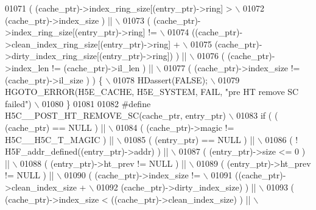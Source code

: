 \begin{DoxyCode}
01071 \textcolor{preprocessor}{     ( (cache\_ptr)->index\_ring\_size[(entry\_ptr)->ring] >                \(\backslash\)}
01072 \textcolor{preprocessor}{       (cache\_ptr)->index\_size ) ||                                     \(\backslash\)}
01073 \textcolor{preprocessor}{     ( (cache\_ptr)->index\_ring\_size[(entry\_ptr)->ring] !=               \(\backslash\)}
01074 \textcolor{preprocessor}{       ((cache\_ptr)->clean\_index\_ring\_size[(entry\_ptr)->ring] +         \(\backslash\)}
01075 \textcolor{preprocessor}{        (cache\_ptr)->dirty\_index\_ring\_size[(entry\_ptr)->ring]) ) ||     \(\backslash\)}
01076 \textcolor{preprocessor}{     ( (cache\_ptr)->index\_len != (cache\_ptr)->il\_len ) ||               \(\backslash\)}
01077 \textcolor{preprocessor}{     ( (cache\_ptr)->index\_size != (cache\_ptr)->il\_size ) ) \{            \(\backslash\)}
01078 \textcolor{preprocessor}{    HDassert(FALSE);                                                    \(\backslash\)}
01079 \textcolor{preprocessor}{    HGOTO\_ERROR(H5E\_CACHE, H5E\_SYSTEM, FAIL, "pre HT remove SC failed") \(\backslash\)}
01080 \textcolor{preprocessor}{\}}
01081 
01082 \textcolor{preprocessor}{#define H5C\_\_POST\_HT\_REMOVE\_SC(cache\_ptr, entry\_ptr)                     \(\backslash\)}
01083 \textcolor{preprocessor}{if ( ( (cache\_ptr) == NULL ) ||                                          \(\backslash\)}
01084 \textcolor{preprocessor}{     ( (cache\_ptr)->magic != H5C\_\_H5C\_T\_MAGIC ) ||                       \(\backslash\)}
01085 \textcolor{preprocessor}{     ( (entry\_ptr) == NULL ) ||                                          \(\backslash\)}
01086 \textcolor{preprocessor}{     ( ! H5F\_addr\_defined((entry\_ptr)->addr) ) ||                        \(\backslash\)}
01087 \textcolor{preprocessor}{     ( (entry\_ptr)->size <= 0 ) ||                                       \(\backslash\)}
01088 \textcolor{preprocessor}{     ( (entry\_ptr)->ht\_prev != NULL ) ||                                 \(\backslash\)}
01089 \textcolor{preprocessor}{     ( (entry\_ptr)->ht\_prev != NULL ) ||                                 \(\backslash\)}
01090 \textcolor{preprocessor}{     ( (cache\_ptr)->index\_size !=                                        \(\backslash\)}
01091 \textcolor{preprocessor}{       ((cache\_ptr)->clean\_index\_size +                                  \(\backslash\)}
01092 \textcolor{preprocessor}{    (cache\_ptr)->dirty\_index\_size) ) ||                              \(\backslash\)}
01093 \textcolor{preprocessor}{     ( (cache\_ptr)->index\_size < ((cache\_ptr)->clean\_index\_size) ) ||    \(\backslash\)}

\end{DoxyCode}
